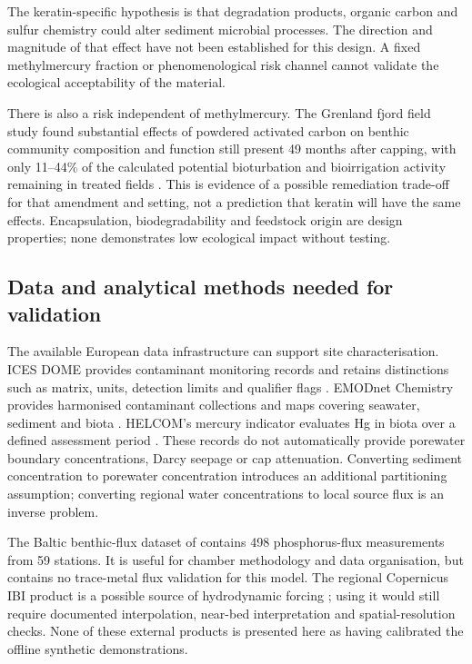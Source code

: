 The keratin-specific hypothesis is that degradation products, organic carbon and sulfur chemistry could alter sediment microbial processes. The direction and magnitude of that effect have not been established for this design. A fixed methylmercury fraction or phenomenological risk channel cannot validate the ecological acceptability of the material.

There is also a risk independent of methylmercury. The Grenland fjord field study found substantial effects of powdered activated carbon on benthic community composition and function still present 49 months after capping, with only 11--44\% of the calculated potential bioturbation and bioirrigation activity remaining in treated fields \citep{raymond2021}. This is evidence of a possible remediation trade-off for that amendment and setting, not a prediction that keratin will have the same effects. Encapsulation, biodegradability and feedstock origin are design properties; none demonstrates low ecological impact without testing.

\subsection{Data and analytical methods needed for validation}

The available European data infrastructure can support site characterisation. ICES DOME provides contaminant monitoring records and retains distinctions such as matrix, units, detection limits and qualifier flags \citep{icesDome}. EMODnet Chemistry provides harmonised contaminant collections and maps covering seawater, sediment and biota \citep{emodnetChemistry}. HELCOM's mercury indicator evaluates Hg in biota over a defined assessment period \citep{helcomMercury}. These records do not automatically provide porewater boundary concentrations, Darcy seepage or cap attenuation. Converting sediment concentration to porewater concentration introduces an additional partitioning assumption; converting regional water concentrations to local source flux is an inverse problem.

The Baltic benthic-flux dataset of \citet{hylen2025} contains 498 phosphorus-flux measurements from 59 stations. It is useful for chamber methodology and data organisation, but contains no trace-metal flux validation for this model. The regional Copernicus IBI product is a possible source of hydrodynamic forcing \citep{copernicusIbi}; using it would still require documented interpolation, near-bed interpretation and spatial-resolution checks. None of these external products is presented here as having calibrated the offline synthetic demonstrations.

